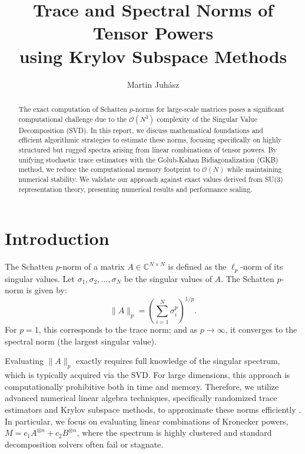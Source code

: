 \documentclass[a4paper,11pt]{article}
\title{Trace and Spectral Norms of Tensor Powers \\ using Krylov Subspace Methods}
\author{Martin Juhász}
\begin{document}
\maketitle

\begin{abstract}
  The exact computation of Schatten $p$-norms for large-scale matrices poses a significant computational challenge due to the $\mathcal{O}(N^3)$ complexity of the Singular Value Decomposition (SVD). In this report, we discuss mathematical foundations and efficient algorithmic strategies to estimate these norms, focusing specifically on highly structured but rugged spectra arising from linear combinations of tensor powers. By unifying stochastic trace estimators with the Golub-Kahan Bidiagonalization (GKB) method, we reduce the computational memory footprint to $\mathcal{O}(N)$ while maintaining numerical stability. We validate our approach against exact values derived from SU(3) representation theory, presenting numerical results and performance scaling.
\end{abstract}

\section{Introduction}

The Schatten $p$-norm of a matrix $A \in \mathbb{C}^{N \times N}$ is defined as the $\ell_p$-norm of its singular values. Let $\sigma_1, \sigma_2, \dots, \sigma_N$ be the singular values of $A$. The Schatten $p$-norm is given by:
\begin{equation}
  \|A\|_p = \left( \sum_{i=1}^N \sigma_i^p \right)^{1/p}.
\end{equation}
For $p=1$, this corresponds to the trace norm; and as $p \to \infty$, it converges to the spectral norm (the largest singular value).

Evaluating $\|A\|_p$ exactly requires full knowledge of the singular spectrum, which is typically acquired via the SVD. For large dimensions, this approach is computationally prohibitive both in time and memory. Therefore, we utilize advanced numerical linear algebra techniques, specifically randomized trace estimators and Krylov subspace methods, to approximate these norms efficiently \cite{benzi2023computation, arrigo2016computation}. In particular, we focus on evaluating linear combinations of Kronecker powers, $M = c_1 A^{\otimes n} + c_2 B^{\otimes n}$, where the spectrum is highly clustered and standard decomposition solvers often fail or stagnate.
\end{document}

